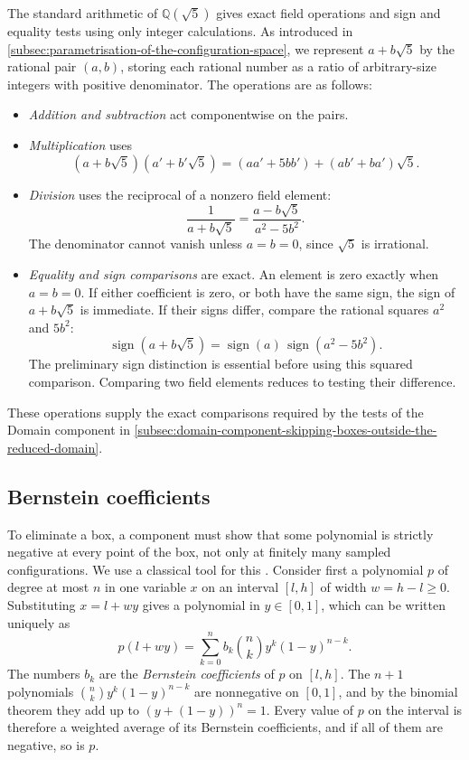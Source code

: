The standard arithmetic of $\mathbb Q(\sqrt5)$ gives exact field operations
and sign and equality tests using only integer calculations.
As introduced in \cref{subsec:parametrisation-of-the-configuration-space},
we represent $a+b\sqrt5$ by the rational pair $(a,b)$, storing each rational
number as a ratio of arbitrary-size integers with positive denominator.
The operations are as follows:
\begin{itemize}
  \item \emph{Addition and subtraction} act componentwise on the pairs.
  \item \emph{Multiplication} uses
    \[
      (a+b\sqrt5)(a'+b'\sqrt5)
        =(aa'+5bb')+(ab'+ba')\sqrt5.
    \]
  \item \emph{Division} uses the reciprocal of a nonzero field element:
    \[
      \frac{1}{a+b\sqrt5}=\frac{a-b\sqrt5}{a^2-5b^2}.
    \]
    The denominator cannot vanish unless $a=b=0$, since $\sqrt5$ is irrational.
  \item \emph{Equality and sign comparisons} are exact. An element is zero
    exactly when $a=b=0$. If either coefficient is zero, or both have the
    same sign, the sign of $a+b\sqrt5$ is immediate. If their signs differ,
    compare the rational squares $a^2$ and $5b^2$:
    \[
      \operatorname{sign}(a+b\sqrt5)
        =\operatorname{sign}(a)\,
          \operatorname{sign}(a^2-5b^2).
    \]
    The preliminary sign distinction is essential before using this squared
    comparison. Comparing two field elements reduces to testing their difference.
\end{itemize}
These operations supply the exact comparisons required by the tests of the
Domain component in \cref{subsec:domain-component-skipping-boxes-outside-the-reduced-domain}.

\subsection{Bernstein coefficients}\label{subsec:bernstein-coefficients}

To eliminate a box, a component must show that some polynomial is strictly
negative at every point of the box, not only at finitely many sampled
configurations. We use a classical tool for this
\citep[Section~3]{Garloff1986}. Consider first a
polynomial $p$ of degree at most $n$ in one variable $x$ on an interval
$[l,h]$ of width $w=h-l\ge0$. Substituting $x=l+wy$ gives a polynomial in
$y\in[0,1]$, which can be written uniquely as
\begin{equation}\label{eq:one-variable-bernstein-form}
  p(l+wy)=\sum_{k=0}^{n}b_k\binom nk y^k(1-y)^{n-k}.
\end{equation}
The numbers $b_k$ are the \emph{Bernstein coefficients} of $p$ on $[l,h]$.
The $n+1$ polynomials $\binom nk y^k(1-y)^{n-k}$ are nonnegative on
$[0,1]$, and by the binomial theorem they add up to
${(y+(1-y))}^n=1$. Every value of $p$ on the interval is therefore a
weighted average of its Bernstein coefficients, and if all of them are
negative, so is $p$.

